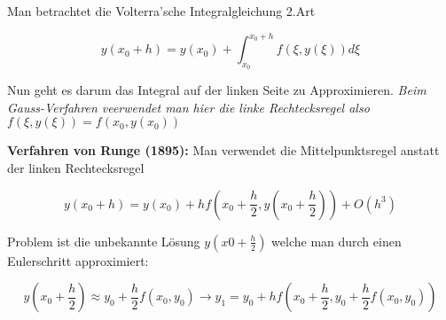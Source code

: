 \documentclass{report}
\begin{document}
Man betrachtet die Volterra'sche Integralgleichung 2.Art 

 \begin{equation}
     y(x_0 + h) = y(x_0) + \int_{x_0}^{x_0 + h} f(\xi, y(\xi))d\xi
\end{equation}

Nun geht es darum das Integral auf der linken Seite zu Approximieren. \emph{Beim Gauss-Verfahren veerwendet man hier die linke Rechtecksregel also $f(\xi, y(\xi))= f(x_0, y(x_0))$}

\textbf{Verfahren von Runge (1895):} Man verwendet die Mittelpunktsregel anstatt der linken Rechtecksregel

\begin{equation}
    y(x_0 + h ) = y(x_0) + hf(x_0 + \frac{h}{2}, y(x_0 + \frac{h}{2})) + O(h^3)
\end{equation}

Problem ist die unbekannte Lösung $y(x0 + \frac{h}{2})$ welche man durch einen Eulerschritt approximiert:

\begin{equation}
    y(x_0 + \frac{h}{2}) \approx y_0 + \frac{h}{2}f(x_0,y_0) \to y_1 = y_0 + hf(x_0 + \frac{h}{2}, y_0 + \frac{h}{2}f(x_0,y_0))
\end{equation}

\end{document}
